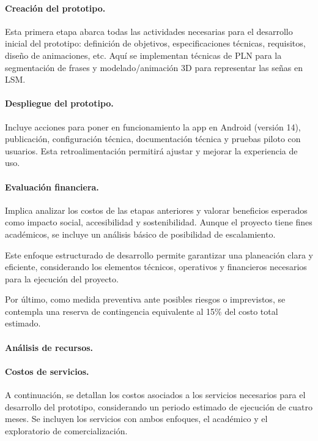 \paragraph{\textbf{Creación del prototipo.}} 
Esta primera etapa abarca todas las actividades necesarias para el desarrollo inicial del prototipo: definición de objetivos, especificaciones técnicas, requisitos, diseño de animaciones, etc. Aquí se implementan técnicas de PLN para la segmentación de frases y modelado/animación 3D para representar las señas en LSM.

\paragraph{\textbf{Despliegue del prototipo.}} 
Incluye acciones para poner en funcionamiento la app en Android (versión 14), publicación, configuración técnica, documentación técnica y pruebas piloto con usuarios. Esta retroalimentación permitirá ajustar y mejorar la experiencia de uso.

\paragraph{\textbf{Evaluación financiera.}} 
Implica analizar los costos de las etapas anteriores y valorar beneficios esperados como impacto social, accesibilidad y sostenibilidad. Aunque el proyecto tiene fines académicos, se incluye un análisis básico de posibilidad de escalamiento.

Este enfoque estructurado de desarrollo permite garantizar una planeación clara y eficiente, considerando los elementos técnicos, operativos y financieros necesarios para la ejecución del proyecto.

Por último, como medida preventiva ante posibles riesgos o imprevistos, se contempla una reserva de contingencia equivalente al 15\% del costo total estimado.


\paragraph{\textbf{Análisis de recursos.}} 
\paragraph{\textbf{Costos de servicios.}} 
A continuación, se detallan los costos asociados a los servicios necesarios para el desarrollo del prototipo, considerando un periodo estimado de ejecución de cuatro meses. Se incluyen los servicios con ambos enfoques, el académico y el exploratorio de comercialización.


